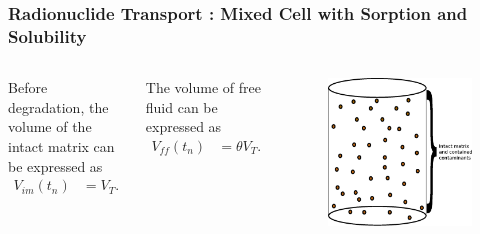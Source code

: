 \begin{frame}
  \frametitle{Radionuclide Transport : Mixed Cell with Sorption and Solubility}
  \footnotesize{
  \begin{columns}[c]
Before degradation, the volume of the intact matrix can be expressed as
\begin{align}
V_{im}(t_n) &= V_T.
\end{align}

The volume of free fluid can be expressed as
\begin{align}
V_{ff}(t_n) &= \theta V_T .
\end{align}

  \begin{figure}[h!]
    \begin{center}
      \includegraphics[width=\textwidth]{images/mixed_cell_whole.eps}
    \end{center}
  \end{figure}
\end{columns}
    }
\end{frame}

